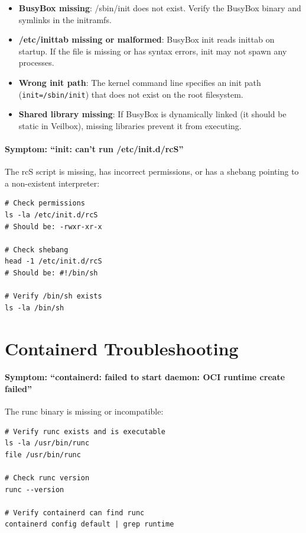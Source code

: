 \begin{itemize}[nosep]
  \item \textbf{BusyBox missing}: /sbin/init does not exist. Verify
        the BusyBox binary and symlinks in the initramfs.
  \item \textbf{/etc/inittab missing or malformed}: BusyBox init reads
        inittab on startup. If the file is missing or has syntax errors,
        init may not spawn any processes.
  \item \textbf{Wrong init path}: The kernel command line specifies an
        init path (\texttt{init=/sbin/init}) that does not exist on the
        root filesystem.
  \item \textbf{Shared library missing}: If BusyBox is dynamically linked
        (it should be static in Veilbox), missing libraries prevent it
        from executing.
\end{itemize}

\paragraph{Symptom: ``init: can't run /etc/init.d/rcS''}

The rcS script is missing, has incorrect permissions, or has a shebang
pointing to a non-existent interpreter:

\begin{lstlisting}
# Check permissions
ls -la /etc/init.d/rcS
# Should be: -rwxr-xr-x

# Check shebang
head -1 /etc/init.d/rcS
# Should be: #!/bin/sh

# Verify /bin/sh exists
ls -la /bin/sh
\end{lstlisting}

\section{Containerd Troubleshooting}

\paragraph{Symptom: ``containerd: failed to start daemon: OCI runtime create failed''}

The runc binary is missing or incompatible:

\begin{lstlisting}
# Verify runc exists and is executable
ls -la /usr/bin/runc
file /usr/bin/runc

# Check runc version
runc --version

# Verify containerd can find runc
containerd config default | grep runtime
\end{lstlisting}

